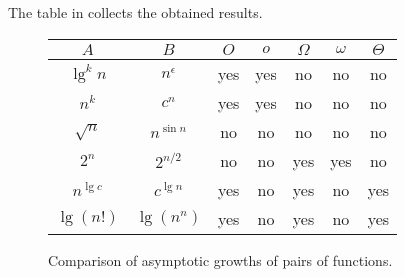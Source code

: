The table in  collects the obtained results.
\begin{figure}[htb]
    \renewcommand{\arraystretch}{1.3}
    \begin{tabular}{cc|c|c|c|c|c|}
        $A$ & $B$ & $O$ & $o$ & $\Omega$ & $\omega$ & $\Theta$ \\
        \hline
        $\lg^kn$ & $n^\epsilon$ & \cellcolor{lightblue}yes & \cellcolor{lightblue}yes & no & no & no \\
        \hline
        $n^k$ & $c^n$ & \cellcolor{lightblue}yes & \cellcolor{lightblue}yes & no & no & no \\
        \hline
        $\sqrt{n}$ & $n^{\sin n}$ & no & no & no & no & no \\
        \hline
        $2^n$ & $2^{n/2}$ & no & no & \cellcolor{lightblue}yes & \cellcolor{lightblue}yes & no \\
        \hline
        $n^{\lg c}$ & $c^{\lg n}$ & \cellcolor{lightblue}yes & no & \cellcolor{lightblue}yes & no & \cellcolor{lightblue}yes \\
        \hline
        $\lg(n!)$ & $\lg(n^n)$ & \cellcolor{lightblue}yes & no & \cellcolor{lightblue}yes & no & \cellcolor{lightblue}yes \\
        \hline
    \end{tabular}
    \caption{Comparison of asymptotic growths of pairs of functions.} \label{fig:3-2}
\end{figure}
